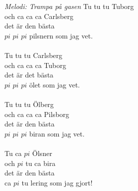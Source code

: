 {\footnotesize\textit{Melodi: Trampa på gasen}}
\vspace{10pt}
Tu tu tu Tuborg\\
och ca ca ca Carlsberg\\
det är den bästa\\
$pi$ $pi$ $pi$ pilsnern som jag vet.\\
\\
Tu tu tu Carlsberg\\
och ca ca ca Tuborg\\
det är det bästa\\
$pi$ $pi$ $pi$ ölet som jag vet.\\
\\
Tu tu tu Ölberg\\
och ca ca ca Pilsborg\\
det är den bästa\\
$pi$ $pi$ $pi$ biran som jag vet.\\
\\
Tu ca $pi$ Ölsner\\
och $pi$ tu ca bira\\
det är den bästa\\
ca $pi$ tu lering som jag gjort!\\
